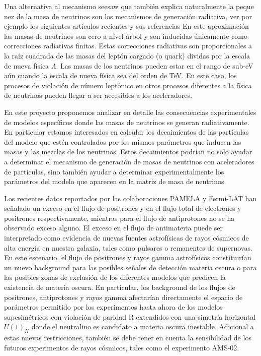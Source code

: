 \begin{ideas}
Una alternativa al mecanismo seesaw que también explica naturalmente
la peque nez de la masa de neutrinos son los mecanismos de generación
radiativa, ver por ejemplo los siguientes artículos recientes y
sus referencias
En este aproximación las masas de neutrinos son cero a nivel árbol y
son inducidas únicamente como correcciones radiativas finitas.  Estas
correcciones radiativas son proporcionales a la raíz cuadrada de
las masas del leptón cargado (o quark) dividas por la escala de nueva
física $\Lambda$. Las masas de los neutrinos pueden estar en el rango
de sub-eV aún cuando la escala de nueva física sea del orden de
TeV. En este caso, los procesos de violación de número leptónico en
otros procesos diferentes a la física de neutrinos pueden llegar
a ser accesibles a los aceleradores.

En este proyecto proponemos analizar en detalle las consecuencias
experimentales de modelos específicos donde las masas de
neutrinos se generan radiativamente. En particular estamos interesados
en calcular los decaimientos de las partículas del modelo que
estén controlados por los mismos parámetros que inducen las masas y
las mezclas de los neutrinos. Estos decaimientos podrían no sólo
ayudar a determinar el mecanismo de generación de masas de neutrinos
con aceleradores de partículas, sino también ayudar a determinar
experimentalmente los parámetros del modelo que aparecen en la matriz
de masa de neutrinos.



Los recientes datos reportados por las colaboraciones PAMELA y Fermi-LAT
han señalado un exceso en el flujo de positrones y en el flujo total de 
electrones y positrones respectivamente, mientras para el flujo de antiprotones no se 
ha observado exceso alguno. El exceso en el flujo de antimateria puede ser 
interpretado como evidencia de nuevas fuentes astrofísicas de rayos cósmicos de 
alta energía en nuestra galaxia, tales como pulsares o remanentes de supernovas. 
En este escenario, el flujo de positrones y rayos gamma astrofísicos constituirían 
un nuevo background para las posibles señales de detección materia oscura o para las posibles zonas 
de exclusión de los diferentes modelos que predicen la existencia de materia oscura. En particular, 
los background de los flujos de positrones, antiprotones y rayos gamma afectarían directamente 
el espacio de parámetros permitido por los experimentos hasta ahora de los modelos 
supesimétricos con violación de paridad R extendidos con una simetría horizontal 
$U(1)_H$ donde el neutralino es candidato a materia oscura inestable. Adicional a 
estas nuevas restricciones, también se debe tener en cuenta la sensibilidad de 
los futuros experimentos de rayos cósmicos, tales como el experimento AMS-02.


\end{ideas}
